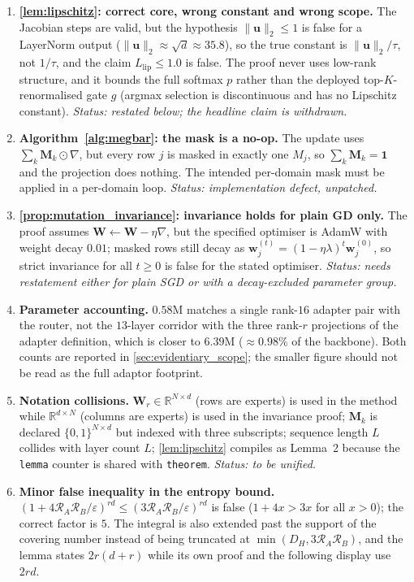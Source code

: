 \documentclass{article}
\theoremstyle{definition}
\begin{document}
\begin{enumerate}[leftmargin=1.5em,itemsep=2pt]
    \item \textbf{\cref{lem:lipschitz}: correct core, wrong constant and wrong scope.} The Jacobian steps are valid, but the hypothesis $\|\mathbf{u}\|_2 \le 1$ is false for a LayerNorm output ($\|\mathbf{u}\|_2 \approx \sqrt{d} \approx 35.8$), so the true constant is $\|\mathbf{u}\|_2/\tau$, not $1/\tau$, and the claim $L_{\text{lip}} \le 1.0$ is false. The proof never uses low-rank structure, and it bounds the full softmax $p$ rather than the deployed top-$K$-renormalised gate $g$ (argmax selection is discontinuous and has no Lipschitz constant). \emph{Status: restated below; the headline claim is withdrawn.}
    \item \textbf{Algorithm~\ref{alg:megbar}: the mask is a no-op.} The update uses $\sum_k \mathbf{M}_k \odot \nabla$, but every row $j$ is masked in exactly one $M_j$, so $\sum_k \mathbf{M}_k = \mathbf{1}$ and the projection does nothing. The intended per-domain mask must be applied in a per-domain loop. \emph{Status: implementation defect, unpatched.}
    \item \textbf{\cref{prop:mutation_invariance}: invariance holds for plain GD only.} The proof assumes $\mathbf{W} \leftarrow \mathbf{W} - \eta\nabla$, but the specified optimiser is AdamW with weight decay $0.01$; masked rows still decay as $\mathbf{w}_j^{(t)} = (1-\eta\lambda)^{t}\mathbf{w}_j^{(0)}$, so strict invariance for all $t \ge 0$ is false for the stated optimiser. \emph{Status: needs restatement either for plain SGD or with a decay-excluded parameter group.}
    \item \textbf{Parameter accounting.} $0.58$M matches a single rank-$16$ adapter pair with the router, not the $13$-layer corridor with the three rank-$r$ projections of the adapter definition, which is closer to $6.39$M ($\approx 0.98\%$ of the backbone). Both counts are reported in \cref{sec:evidentiary_scope}; the smaller figure should not be read as the full adaptor footprint.
    \item \textbf{Notation collisions.} $\mathbf{W}_r \in \mathbb{R}^{N \times d}$ (rows are experts) is used in the method while $\mathbb{R}^{d \times N}$ (columns are experts) is used in the invariance proof; $\mathbf{M}_k$ is declared $\{0,1\}^{N \times d}$ but indexed with three subscripts; sequence length $L$ collides with layer count $L$; \cref{lem:lipschitz} compiles as Lemma~2 because the \texttt{lemma} counter is shared with \texttt{theorem}. \emph{Status: to be unified.}
    \item \textbf{Minor false inequality in the entropy bound.} $(1+4\mathcal{R}_A\mathcal{R}_B/\varepsilon)^{rd} \le (3\mathcal{R}_A\mathcal{R}_B/\varepsilon)^{rd}$ is false ($1+4x > 3x$ for all $x>0$); the correct factor is $5$. The integral is also extended past the support of the covering number instead of being truncated at $\min(D_H, 3\mathcal{R}_A\mathcal{R}_B)$, and the lemma states $2r(d+r)$ while its own proof and the following display use $2rd$.
\end{enumerate}
\end{document}
